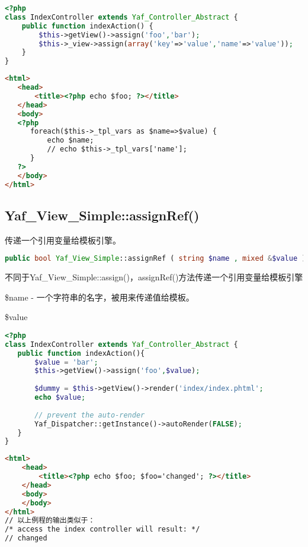 \begin{lstlisting}[language=PHP]
<?php
class IndexController extends Yaf_Controller_Abstract {
    public function indexAction() {
        $this->getView()->assign('foo','bar');
        $this->_view->assign(array('key'=>'value','name'=>'value'));
    }
}
\end{lstlisting}



\begin{lstlisting}[language=HTML]
<html>
   <head>
       <title><?php echo $foo; ?></title>
   </head>
   <body>
   <?php
      foreach($this->_tpl_vars as $name=>$value) {
          echo $name; 
          // echo $this->_tpl_vars['name'];
      }
   ?>
   </body>
</html>
\end{lstlisting}



\subsection{Yaf\_View\_Simple::assignRef()}

传递一个引用变量给模板引擎。

\begin{lstlisting}[language=PHP]
public bool Yaf_View_Simple::assignRef ( string $name , mixed &$value )
\end{lstlisting}

不同于Yaf\_View\_Simple::assign()，assignRef()方法传递一个引用变量给模板引擎


\begin{compactitem}
\item \$name - 一个字符串的名字，被用来传递值给模板。
\item \$value
\end{compactitem}



\begin{lstlisting}[language=PHP]
<?php
class IndexController extends Yaf_Controller_Abstract {
   public function indexAction(){
       $value = 'bar';
       $this->getView()->assign('foo',$value);
       
       $dummy = $this->getView()->render('index/index.phtml';
       echo $value;
       
       // prevent the auto-render
       Yaf_Dispatcher::getInstance()->autoRender(FALSE);
   }
}
\end{lstlisting}



\begin{lstlisting}[language=HTML]
<html>
    <head>
        <title><?php echo $foo; $foo='changed'; ?></title>
    </head>
    <body>
    </body>
</html>
// 以上例程的输出类似于：
/* access the index controller will result: */
// changed
\end{lstlisting}




